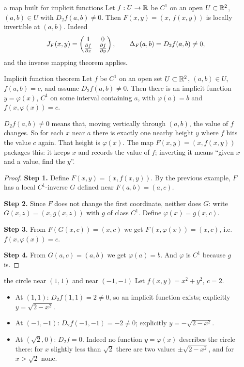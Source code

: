 \begin{example}{a map built for implicit functions}
Let $f:U\to\mathbb{R}$ be $C^1$ on an open $U\subset\mathbb{R}^2$, $(a,b)\in U$ with $D_2f(a,b)\neq0$. Then
$F(x,y)=(x,\,f(x,y))$ is locally invertible at $(a,b)$. Indeed
\[ J_F(x,y)=\begin{pmatrix}1&0\\ \frac{\partial f}{\partial x}&\frac{\partial f}{\partial y}\end{pmatrix},\qquad \Delta_F(a,b)=D_2f(a,b)\neq0, \]
and the inverse mapping theorem applies.
\end{example}

\begin{theorem}[label=thm:implicit]{Implicit function theorem}
Let $f$ be $C^1$ on an open set $U\subset\mathbb{R}^2$, $(a,b)\in U$, $f(a,b)=c$, and assume $D_2f(a,b)\neq0$.
Then there is an implicit function $y=\varphi(x)$, $C^1$ on some interval containing $a$, with
$\varphi(a)=b$ and $f(x,\varphi(x))=c$.
\end{theorem}

\begin{intuition}
$D_2f(a,b)\neq0$ means that, moving vertically through $(a,b)$, the value of $f$ changes. So for
each $x$ near $a$ there is exactly one nearby height $y$ where $f$ hits the value $c$ again. That
height is $\varphi(x)$. The map $F(x,y)=(x,f(x,y))$ packages this: it keeps $x$ and records the
value of $f$; inverting it means ``given $x$ and a value, find the $y$''.
\end{intuition}

\begin{proof}
\textbf{Step 1.} Define $F(x,y)=(x,f(x,y))$. By the previous example, $F$ has a local $C^1$-inverse
$G$ defined near $F(a,b)=(a,c)$.

\textbf{Step 2.} Since $F$ does not change the first coordinate, neither does $G$: write
$G(x,z)=(x,g(x,z))$ with $g$ of class $C^1$. Define $\varphi(x)=g(x,c)$.

\textbf{Step 3.} From $F(G(x,c))=(x,c)$ we get $F(x,\varphi(x))=(x,c)$, i.e. $f(x,\varphi(x))=c$.

\textbf{Step 4.} From $G(a,c)=(a,b)$ we get $\varphi(a)=b$. And $\varphi$ is $C^1$ because $g$ is.
\end{proof}

\begin{example}{the circle near $(1,1)$ and near $(-1,-1)$}
Let $f(x,y)=x^2+y^2$, $c=2$.
\begin{itemize}
  \item At $(1,1)$: $D_2f(1,1)=2\neq0$, so an implicit function exists; explicitly $y=\sqrt{2-x^2}$.
  \item At $(-1,-1)$: $D_2f(-1,-1)=-2\neq0$; explicitly $y=-\sqrt{2-x^2}$.
  \item At $(\sqrt2,0)$: $D_2f=0$. Indeed no function $y=\varphi(x)$ describes the circle there: for
  $x$ slightly less than $\sqrt2$ there are two values $\pm\sqrt{2-x^2}$, and for $x>\sqrt2$ none.
\end{itemize}
\end{example}

